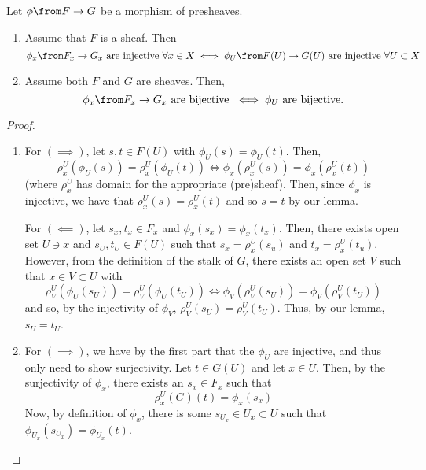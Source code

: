 \documentclass[11pt,leqno,oneside]{amsbook}
\renewcommand{\F}{F}
\newcommand{\G}{G}
\numberwithin{thm}{section}
\begin{document}
\begin{prop}
  Let \(\phi \from \F \to \G\) be a morphism of presheaves.
  \begin{enumerate}
  \item Assume that \(\F\) is a sheaf. Then \[
      \phi_x \from \F_x \to \G_x \text{ are injective }\forall x \in X
      \iff \phi_U \from \F(U) \to \G(U) \text{ are injective }\forall
      U \subset X
    \]
  \item Assume both \(\F\) and \(\G\) are sheaves. Then, \[
      \phi_x \from \F_x \to \G_x \text{ are bijective }\iff \phi_U
      \text{ are bijective.}
    \]
  \end{enumerate}
\end{prop}
\begin{proof}
  \begin{enumerate}
  \item For \((\implies)\), let \(s,t \in \F(U)\) with \(\phi_U(s) =
    \phi_U(t)\). Then, \[
      \rho^U_x(\phi_U(s)) = \rho^U_x(\phi_U(t)) \iff
      \phi_x(\rho^U_x(s)) = \phi_x(\rho^U_x(t))
    \]
    (where \(\rho^U_x\) has domain for the appropriate
    (pre)sheaf). Then, since \(\phi_x\) is injective, we have that
    \(\rho^U_x(s) = \rho^U_x(t)\) and so \(s=t\) by our lemma.

    For \((\impliedby)\), let \(s_x,t_x \in F_x\) and \(\phi_x(s_x) =
    \phi_x(t_x)\). Then, there exists open set \(U \ni x\) and
    \(s_U,t_U \in F(U)\) such that \(s_x = \rho^U_x(s_u)\) and \(t_x =
    \rho^U_x(t_u)\). However, from the definition of the stalk of
    \(G\), there 
    exists an open set \(V\) such that \(x \in V \subset U\) with \[
      \rho^U_V(\phi_U(s_U)) = \rho^U_V(\phi_U(t_U)) \iff
      \phi_V(\rho^U_V(s_U)) = \phi_V(\rho^U_V(t_U))
    \]
    and so, by the injectivity of \(\phi_V\), \(\rho^U_V(s_U) =
    \rho^U_V(t_U)\). Thus, by our lemma, \(s_U = t_U\).
  \item For \((\implies)\), we have by the first part that the
    \(\phi_U\) are injective, and thus only need to show
    surjectivity. Let \(t \in \G(U)\) and let \(x \in U\). Then, by
    the surjectivity of \(\phi_x\), there
    exists an \(s_x \in \F_x\) such that \[
      \rho^U_x(G)(t) = \phi_x(s_x)
    \]
    Now, by definition of \(\phi_x\),  there is some \(s_{U_x} \in U_x
    \subset U\) such
    that \(\phi_{U_x}(s_{U_x}) = \phi_{U_x}(t)\). 
  \end{enumerate}
\end{proof}
\begin{bibdiv}
  \begin{biblist}
  \end{biblist}
\end{bibdiv}
\end{document}
